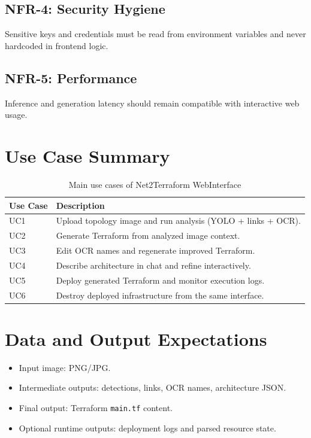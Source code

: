 \documentclass[12pt,a4paper,openany]{report}
\begin{document}
\subsection{NFR-4: Security Hygiene}

Sensitive keys and credentials must be read from environment variables and never hardcoded in frontend logic.

\subsection{NFR-5: Performance}

Inference and generation latency should remain compatible with interactive web usage.

\section{Use Case Summary}

\begin{table}[H]
\centering
\caption{Main use cases of Net2Terraform WebInterface}
\label{tab:use_cases}
\begin{tabular}{p{} p{}}
\toprule
\textbf{Use Case} & \textbf{Description} \\
\midrule
UC1 & Upload topology image and run analysis (YOLO + links + OCR). \\
UC2 & Generate Terraform from analyzed image context. \\
UC3 & Edit OCR names and regenerate improved Terraform. \\
UC4 & Describe architecture in chat and refine interactively. \\
UC5 & Deploy generated Terraform and monitor execution logs. \\
UC6 & Destroy deployed infrastructure from the same interface. \\
\bottomrule
\end{tabular}
\end{table}

\section{Data and Output Expectations}

\begin{itemize}
    \item Input image: PNG/JPG.
    \item Intermediate outputs: detections, links, OCR names, architecture JSON.
    \item Final output: Terraform \texttt{main.tf} content.
    \item Optional runtime outputs: deployment logs and parsed resource state.
\end{itemize}
\end{document}
